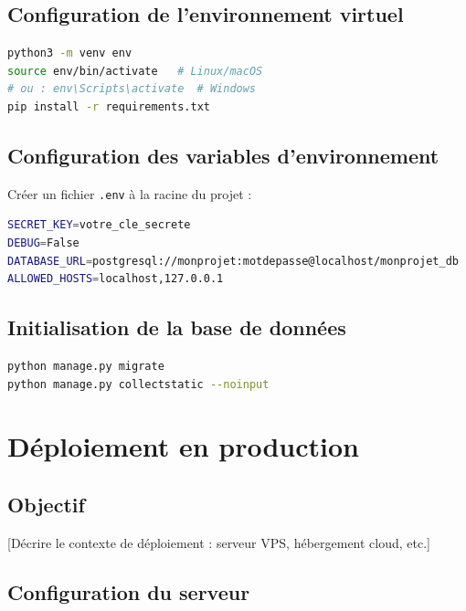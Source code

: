 \documentclass[12pt, a4paper]{article}
\begin{document}
\subsection{Configuration de l'environnement virtuel}

\begin{lstlisting}[language=bash, caption=Création et activation de l'environnement]
python3 -m venv env
source env/bin/activate   # Linux/macOS
# ou : env\Scripts\activate  # Windows
pip install -r requirements.txt
\end{lstlisting}

\subsection{Configuration des variables d'environnement}

Créer un fichier \texttt{.env} à la racine du projet :

\begin{lstlisting}[language=bash, caption=Exemple de fichier .env]
SECRET_KEY=votre_cle_secrete
DEBUG=False
DATABASE_URL=postgresql://monprojet:motdepasse@localhost/monprojet_db
ALLOWED_HOSTS=localhost,127.0.0.1
\end{lstlisting}

\subsection{Initialisation de la base de données}

\begin{lstlisting}[language=bash, caption=Migrations et initialisation]
python manage.py migrate
python manage.py collectstatic --noinput
\end{lstlisting}

\section{Déploiement en production}

\subsection{Objectif}

[Décrire le contexte de déploiement : serveur VPS, hébergement cloud, etc.]

\subsection{Configuration du serveur}
\end{document}
